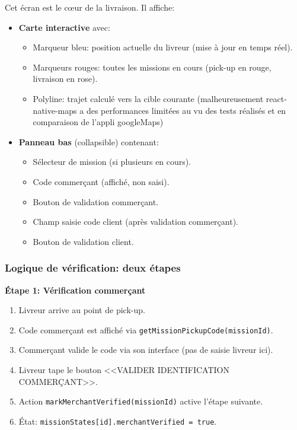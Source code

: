 Cet écran est le cœur de la livraison. Il affiche:
\begin{itemize}
    \item \textbf{Carte interactive} avec:
    \begin{itemize}
        \item Marqueur bleu: position actuelle du livreur (mise à jour en temps réel).
        \item Marqueurs rouges: toutes les missions en cours (pick-up en rouge, livraison en rose).
        \item Polyline: trajet calculé vers la cible courante (malheureusement react-native-maps a des performances limitées au vu des tests réalisés et en comparaison de l'appli googleMaps)
    \end{itemize}
    \item \textbf{Panneau bas} (collapsible) contenant:
    \begin{itemize}
        \item Sélecteur de mission (si plusieurs en cours).
        \item Code commerçant (affiché, non saisi).
        \item Bouton de validation commerçant.
        \item Champ saisie code client (après validation commerçant).
        \item Bouton de validation client.
    \end{itemize}
\end{itemize}

\subsubsection{Logique de vérification: deux étapes}

\textbf{Étape 1: Vérification commerçant}
\begin{enumerate}
    \item Livreur arrive au point de pick-up.
    \item Code commerçant est affiché via \texttt{getMissionPickupCode(missionId)}.
    \item Commerçant valide le code via son interface (pas de saisie livreur ici).
    \item Livreur tape le bouton <<VALIDER IDENTIFICATION COMMERÇANT>>.
    \item Action \texttt{markMerchantVerified(missionId)} active l'étape suivante.
    \item État: \texttt{missionStates[id].merchantVerified = true}.
\end{enumerate}

